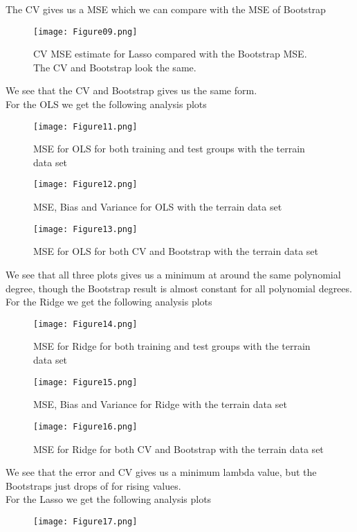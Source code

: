\documentclass[11pt, A4paper, english]{article}
\begin{document}
\begin{multicols}{2}
The CV gives us a MSE which we can compare with the MSE of Bootstrap
			\begin{figure}[H]
\texttt{[image: Figure09.png]}
\caption{CV MSE estimate for Lasso compared with the Bootstrap MSE. The CV and Bootstrap look the same.}
			\end{figure}
We see that the CV and Bootstrap gives us the same form. \\
For the OLS we get the following analysis plots
			\begin{figure}[H]
\texttt{[image: Figure11.png]}
\caption{MSE for OLS for both training and test groups with the terrain data set}
			\end{figure}
			\begin{figure}[H]
\texttt{[image: Figure12.png]}
\caption{MSE, Bias and Variance for OLS with the terrain data set}
			\end{figure}
			\begin{figure}[H]
\texttt{[image: Figure13.png]}
\caption{MSE for OLS for both CV and Bootstrap with the terrain data set}
			\end{figure}
We see that all three plots gives us a minimum at around the same polynomial degree, though the Bootstrap result is almost constant for all polynomial degrees. \\
For the Ridge we get the following analysis plots
			\begin{figure}[H]
\texttt{[image: Figure14.png]}
\caption{MSE for Ridge for both training and test groups with the terrain data set}
			\end{figure}
			\begin{figure}[H]
\texttt{[image: Figure15.png]}
\caption{MSE, Bias and Variance for Ridge with the terrain data set}
			\end{figure}
			\begin{figure}[H]
\texttt{[image: Figure16.png]}
\caption{MSE for Ridge for both CV and Bootstrap with the terrain data set}
			\end{figure}
We see that the error and CV gives us a minimum lambda value, but the Bootstraps just drops of for rising values. \\
For the Lasso we get the following analysis plots
			\begin{figure}[H]
\texttt{[image: Figure17.png]}

\end{figure}
\end{multicols}
\end{document}
